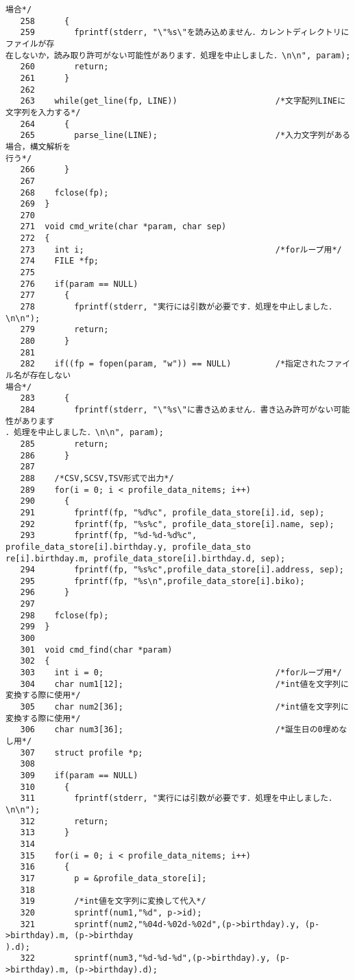 \begin{Verbatim}[fontsize=\small, baselinestretch=0.8]
場合*/
   258	    {
   259	      fprintf(stderr, "\"%s\"を読み込めません．カレントディレクトリにファイルが存
在しないか，読み取り許可がない可能性があります．処理を中止しました．\n\n", param);
   260	      return;
   261	    }
   262	
   263	  while(get_line(fp, LINE))                    /*文字配列LINEに文字列を入力する*/
   264	    {
   265	      parse_line(LINE);                        /*入力文字列がある場合，構文解析を
行う*/
   266	    }
   267	
   268	  fclose(fp);
   269	}
   270	
   271	void cmd_write(char *param, char sep)
   272	{
   273	  int i;                                       /*forループ用*/
   274	  FILE *fp;
   275	
   276	  if(param == NULL)
   277	    {
   278	      fprintf(stderr, "実行には引数が必要です．処理を中止しました．\n\n");
   279	      return;
   280	    }
   281	
   282	  if((fp = fopen(param, "w")) == NULL)         /*指定されたファイル名が存在しない
場合*/
   283	    {
   284	      fprintf(stderr, "\"%s\"に書き込めません．書き込み許可がない可能性があります
．処理を中止しました．\n\n", param);
   285	      return;
   286	    }
   287	
   288	  /*CSV,SCSV,TSV形式で出力*/
   289	  for(i = 0; i < profile_data_nitems; i++)
   290	    {
   291	      fprintf(fp, "%d%c", profile_data_store[i].id, sep);
   292	      fprintf(fp, "%s%c", profile_data_store[i].name, sep);
   293	      fprintf(fp, "%d-%d-%d%c", profile_data_store[i].birthday.y, profile_data_sto
re[i].birthday.m, profile_data_store[i].birthday.d, sep);
   294	      fprintf(fp, "%s%c",profile_data_store[i].address, sep);
   295	      fprintf(fp, "%s\n",profile_data_store[i].biko);
   296	    }
   297	
   298	  fclose(fp);
   299	}
   300	
   301	void cmd_find(char *param)
   302	{
   303	  int i = 0;                                   /*forループ用*/
   304	  char num1[12];                               /*int値を文字列に変換する際に使用*/
   305	  char num2[36];                               /*int値を文字列に変換する際に使用*/
   306	  char num3[36];                               /*誕生日の0埋めなし用*/
   307	  struct profile *p;
   308	
   309	  if(param == NULL)
   310	    {
   311	      fprintf(stderr, "実行には引数が必要です．処理を中止しました．\n\n");
   312	      return;
   313	    }
   314	
   315	  for(i = 0; i < profile_data_nitems; i++)
   316	    {
   317	      p = &profile_data_store[i];
   318	
   319	      /*int値を文字列に変換して代入*/
   320	      sprintf(num1,"%d", p->id);
   321	      sprintf(num2,"%04d-%02d-%02d",(p->birthday).y, (p->birthday).m, (p->birthday
).d);
   322	      sprintf(num3,"%d-%d-%d",(p->birthday).y, (p->birthday).m, (p->birthday).d);

\end{Verbatim}
